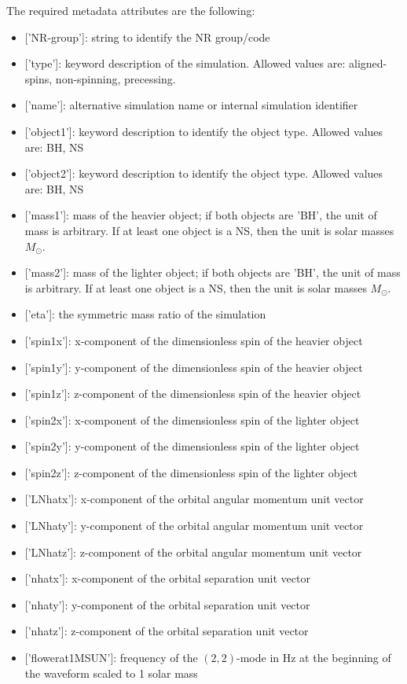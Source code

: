 \documentclass[11pt,tightenlines,article,amssymb,amsmath,amsfonts,superscriptaddress]{revtex4}
\begin{document}
The required metadata attributes are the following:
\begin{itemize}
\item {[}'NR-group'{]}: string to identify the NR group/code
\item {[}'type'{]}: keyword description of the simulation. Allowed values are: aligned-spins, non-spinning, precessing.
\item{[}'name'{]}: alternative simulation name or internal simulation identifier
\item{[}'object1'{]}: keyword description to identify the object type. Allowed values are: BH, NS
\item {[}'object2'{]}: keyword description to identify the object type. Allowed values are: BH, NS
\item{[}'mass1'{]}: mass of the heavier object; if both objects are 'BH', the unit of mass is arbitrary. If at least one object is a NS, then the unit is solar masses $M_\odot$.
\item{[}'mass2'{]}: mass of the lighter object; if both objects are 'BH', the unit of mass is arbitrary. If at least one object is a NS, then the unit is solar masses $M_\odot$.
\item{[}'eta'{]}: the symmetric mass ratio of the simulation
\item{[}'spin1x'{]}: x-component of the dimensionless spin of the heavier object
\item{[}'spin1y'{]}: y-component of the dimensionless spin of the heavier object 
\item{[}'spin1z'{]}: z-component of the dimensionless spin of the heavier object
\item{[}'spin2x'{]}: x-component of the dimensionless spin of the lighter object
\item{[}'spin2y'{]}: y-component of the dimensionless spin of the lighter object 
\item{[}'spin2z'{]}: z-component of the dimensionless spin of the lighter object
\item{[}'LNhatx'{]}: x-component of the orbital angular momentum unit vector
\item{[}'LNhaty'{]}: y-component of the orbital angular momentum unit vector
\item{[}'LNhatz'{]}: z-component of the orbital angular momentum unit vector
\item{[}'nhatx'{]}: x-component of the orbital separation unit vector
\item{[}'nhaty'{]}: y-component of the orbital separation unit vector
\item{[}'nhatz'{]}: z-component of the orbital separation unit vector
\item{[}'f\textunderscore lower\textunderscore at\textunderscore 1MSUN'{]}: frequency of the $(2,2)$-mode in Hz at the beginning of the waveform scaled to 1 solar mass
\end{itemize}
\end{document}
